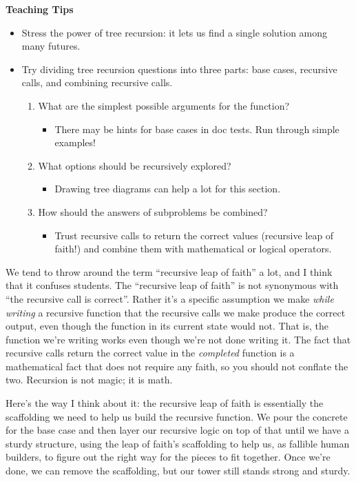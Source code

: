 \begin{meta}
\textbf{Teaching Tips}
\begin{itemize}
    \item Stress the power of tree recursion: it lets us find a single solution among many futures.
    \item Try dividing tree recursion questions into three parts: base cases, recursive calls, and combining recursive calls.
    \begin{enumerate}
        \item What are the simplest possible arguments for the function?
        \begin{itemize}
            \item There may be hints for base cases in doc tests. Run through simple examples!
        \end{itemize}
        \item What options should be recursively explored?
        \begin{itemize}
            \item Drawing tree diagrams can help a lot for this section.
        \end{itemize}
        \item How should the answers of subproblems be combined?
        \begin{itemize}
            \item Trust recursive calls to return the correct values (recursive leap of faith!) and combine them with mathematical or logical operators.
        \end{itemize}
    \end{enumerate}
\end{itemize}
We tend to throw around the term ``recursive leap of faith'' a lot, and I think that it confuses students. The ``recursive leap of faith'' is not synonymous with ``the recursive call is correct''. Rather it's a specific assumption we make \textit{while writing} a recursive function that the recursive calls we make produce the correct output, even though the function in its current state would not. That is, the function we're writing works even though we're not done writing it. The fact that recursive calls return the correct value in the \textit{completed} function is a mathematical fact that does not require any faith, so you should not conflate the two. Recursion is not magic; it is math.

Here's the way I think about it: the recursive leap of faith is essentially the scaffolding we need to help us build the recursive function. We pour the concrete for the base case and then layer our recursive logic on top of that until we have a sturdy structure, using the leap of faith's scaffolding to help us, as fallible human builders, to figure out the right way for the pieces to fit together. Once we're done, we can remove the scaffolding, but our tower still stands strong and sturdy. 
\end{meta}
